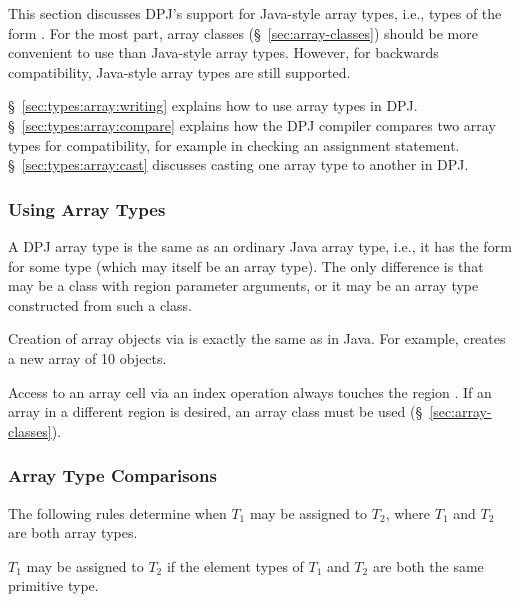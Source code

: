 This section discusses DPJ's support for Java-style array types, i.e.,
types of the form .  For the most part, array classes
(\S~\ref{sec:array-classes}) should be more convenient to use than
Java-style array types.  However, for backwards compatibility,
Java-style array types are still supported.

\S~\ref{sec:types:array:writing} explains how to use array types in
DPJ.  \S~\ref{sec:types:array:compare} explains how the DPJ compiler
compares two array types for compatibility, for example in checking an
assignment statement.  \S~\ref{sec:types:array:cast} discusses casting
one array type to another in DPJ.

\subsubsection{Using Array Types%
\label{sec:types:array:writing}}

A DPJ array type is the same as an ordinary Java array type, i.e., it
has the form  for some type  (which may itself be an
array type).  The only difference is that  may be a class with
region parameter arguments, or it may be an array type constructed
from such a class.  

Creation of array objects via  is exactly the same as in
Java.  For example,  creates a new array of 10
 objects.

Access to an array cell via an index operation always touches the
region .  If an array in a different region is desired, an
array class must be used (\S~\ref{sec:array-classes}).

\subsubsection{Array Type Comparisons%
\label{sec:types:array:compare}}

The following rules determine when $T_1$ may be assigned to $T_2$,
where $T_1$ and $T_2$ are both array types.

 $T_1$ may be assigned to
$T_2$ if the element types of $T_1$ and $T_2$ are both the same
primitive type.

